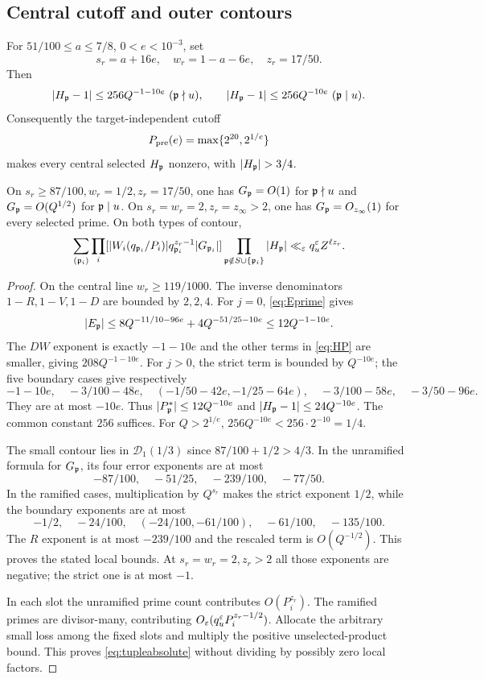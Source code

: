 \subsection{Central cutoff and outer contours}
\begin{lemma}\label{lem:cutoff}
For $51/100\le a\le7/8$, $0<e<10^{-3}$, set
\[
 s_r=a+16e,\quad w_r=1-a-6e,\quad z_r=17/50.
\]
Then
\[
 |H_\mathfrak p-1|\le256Q^{-1-10e}\ (\mathfrak p\nmid u),\qquad
 |H_\mathfrak p-1|\le256Q^{-10e}\ (\mathfrak p\mid u).
\]
Consequently the target-independent cutoff
\begin{equation}\label{eq:precutoff}
 P_{\rm pre}(e)=\max\{2^{20},2^{1/e}\}
\end{equation}
makes every central selected $H_\mathfrak p$ nonzero, with $|H_\p|>3/4$.

On $s_r\ge87/100,w_r=1/2,z_r=17/50$, one has $G_\mathfrak p=O(1)$ for $\mathfrak p\nmid u$ and $G_\mathfrak p=O(Q^{1/2})$ for $\mathfrak p\mid u$. On $s_r=w_r=2,z_r=z_\infty>2$, one has $G_\mathfrak p=O_{z_\infty}(1)$ for every selected prime. On both types of contour,
\begin{equation}\label{eq:tupleabsolute}
 \sum_{(\mathfrak p_i)}\prod_i[|W_i(q_{\mathfrak p_i}/P_i)|q_{\mathfrak p_i}^{z_r-1}|G_{\mathfrak p_i}|]
 \prod_{\mathfrak p\notin S\cup\{\mathfrak p_i\}}|H_\mathfrak p|
 \ll_\varepsilon q_u^\varepsilon Z^{\ell z_r}.
\end{equation}
\end{lemma}
\begin{proof}
On the central line $w_r\ge119/1000$. The inverse denominators $1-R,1-V,1-D$ are bounded by $2,2,4$. For $j=0$, \eqref{eq:Eprime} gives
\[
 |E_\mathfrak p|\le8Q^{-11/10-96e}+4Q^{-51/25-10e}\le12Q^{-1-10e}.
\]
The $DW$ exponent is exactly $-1-10e$ and the other terms in \eqref{eq:HP} are smaller, giving $208Q^{-1-10e}$. For $j>0$, the strict term is bounded by $Q^{-10e}$; the five boundary cases give respectively
\[
 -1-10e,\quad-3/100-48e,\quad(-1/50-42e,-1/25-64e),\quad
 -3/100-58e,\quad-3/50-96e.
\]
They are at most $-10e$. Thus $|P_\mathfrak p^*|\le12Q^{-10e}$ and $|H_\mathfrak p-1|\le24Q^{-10e}$. The common constant $256$ suffices. For $Q>2^{1/e}$, $256Q^{-10e}<256\cdot2^{-10}=1/4$.

The small contour lies in $\mathcal D_1(1/3)$ since $87/100+1/2>4/3$. In the unramified formula for $G_\mathfrak p$, its four error exponents are at most
\[
 -87/100,\quad-51/25,\quad-239/100,\quad-77/50.
\]
In the ramified cases, multiplication by $Q^{s_r}$ makes the strict exponent $1/2$, while the boundary exponents are at most
\[
 -1/2,\quad-24/100,\quad(-24/100,-61/100),\quad-61/100,\quad-135/100.
\]
The $R$ exponent is at most $-239/100$ and the rescaled term is $O(Q^{-1/2})$. This proves the stated local bounds. At $s_r=w_r=2,z_r>2$ all those exponents are negative; the strict one is at most $-1$.

In each slot the unramified prime count contributes $O(P_i^{z_r})$. The ramified primes are divisor-many, contributing $O_\varepsilon(q_u^\varepsilon P_i^{z_r-1/2})$. Allocate the arbitrary small loss among the fixed slots and multiply the positive unselected-product bound. This proves \eqref{eq:tupleabsolute} without dividing by possibly zero local factors.
\end{proof}
